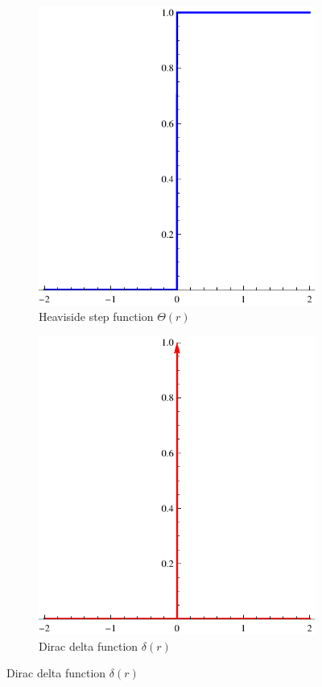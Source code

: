 \documentclass[12pt,a4paper]{report}
\numberwithin{equation}{chapter}
\begin{document}
\begin{figure}
\centering
\begin{subfigure}{0.45\textwidth}
\caption{Heaviside step function $\Theta(r)$}\label{fig:diracH-heaviside}
\includegraphics[width=\textwidth]{figures/diracH-heaviside.pdf}
\end{subfigure}%
\hspace{0.02\textwidth}
\begin{subfigure}{0.45\textwidth}
\caption{Dirac delta function $\delta(r)$}\label{fig:diracH-dirac}
\includegraphics[width=\textwidth]{figures/diracH-dirac.pdf}
\end{subfigure}%


\end{figure}
\end{document}
